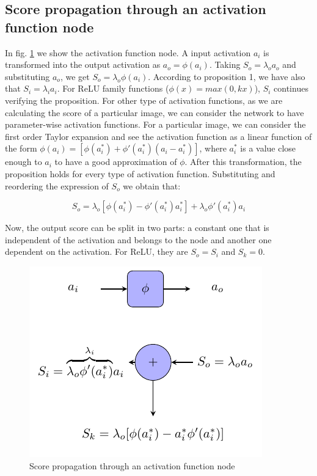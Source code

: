 \documentclass[review]{elsarticle}
\theoremstyle{definition} %
\theoremstyle{remark}
\begin{document}
\subsection{Score propagation through an activation function node} 

In fig. \ref{fig:score_af} we show the activation function node. A input activation $a_i$ is transformed into the output activation as $a_o = \phi(a_i)$. Taking $S_o = \lambda_o a_o$ and substituting $a_o$, we get $S_o = \lambda_o \phi(a_i)$. According to proposition 1, we have also that $S_i = \lambda_i a_i$. For ReLU family functions ($\phi(x) = max(0, kx)$), $S_i$ continues verifying the proposition. For other type of activation functions, as we are calculating the score of a particular image, we can consider the network to have parameter-wise activation functions. For a particular image, we can consider the first order Taylor expansion and see the activation function as a linear function of the form $\phi(a_i) = [\phi(a^*_i) + \phi'(a^*_i)(a_i - a^*_i)]$, where $a^*_i$ is a value close enough to $a_i$ to have a good approximation of $\phi$. After this transformation, the proposition holds for every type of activation function. Substituting and reordering the expression of $S_o$ we obtain that:

\begin{equation}
	S_o = \lambda_o[\phi(a^*_i) - \phi'(a^*_i)a^*_i] + \lambda_o \phi'(a^*_i)a_i
\end{equation}

Now, the output score can be split in two parts: a constant one that is independent of the activation and belongs to the node and another one dependent on the activation. For ReLU, they are $S_o = S_i$ and $S_k = 0$.

\begin{figure}[!ht]
	\centering
	\includegraphics{./figures/score_af.pdf}
	\caption{Score propagation through an activation function node}
	\label{fig:score_af}
\end{figure}
\end{document}
